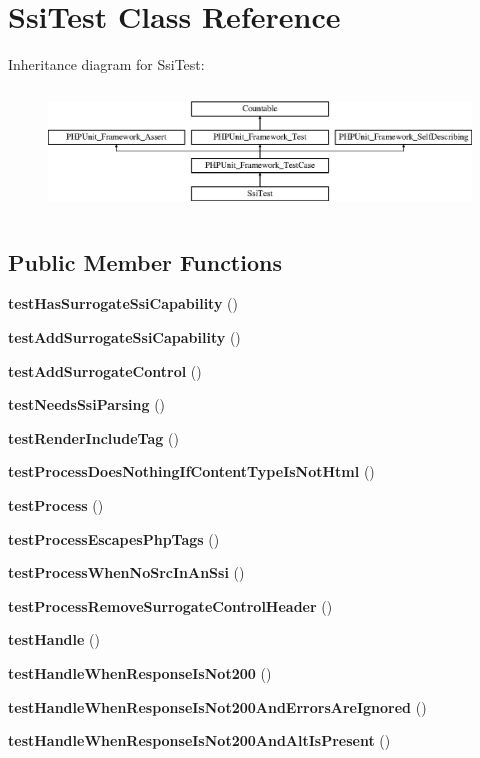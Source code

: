 \section{Ssi\+Test Class Reference}
\label{class_symfony_1_1_component_1_1_http_kernel_1_1_tests_1_1_http_cache_1_1_ssi_test}
Inheritance diagram for Ssi\+Test\+:\begin{figure}[H]
\begin{center}
\leavevmode
\includegraphics[height=3.303835cm]{class_symfony_1_1_component_1_1_http_kernel_1_1_tests_1_1_http_cache_1_1_ssi_test}
\end{center}
\end{figure}
\subsection*{Public Member Functions}
\begin{DoxyCompactItemize}
\item 
{\bf test\+Has\+Surrogate\+Ssi\+Capability} ()
\item 
{\bf test\+Add\+Surrogate\+Ssi\+Capability} ()
\item 
{\bf test\+Add\+Surrogate\+Control} ()
\item 
{\bf test\+Needs\+Ssi\+Parsing} ()
\item 
{\bf test\+Render\+Include\+Tag} ()
\item 
{\bf test\+Process\+Does\+Nothing\+If\+Content\+Type\+Is\+Not\+Html} ()
\item 
{\bf test\+Process} ()
\item 
{\bf test\+Process\+Escapes\+Php\+Tags} ()
\item 
{\bf test\+Process\+When\+No\+Src\+In\+An\+Ssi} ()
\item 
{\bf test\+Process\+Remove\+Surrogate\+Control\+Header} ()
\item 
{\bf test\+Handle} ()
\item 
{\bf test\+Handle\+When\+Response\+Is\+Not200} ()
\item 
{\bf test\+Handle\+When\+Response\+Is\+Not200\+And\+Errors\+Are\+Ignored} ()
\item 
{\bf test\+Handle\+When\+Response\+Is\+Not200\+And\+Alt\+Is\+Present} ()
\end{DoxyCompactItemize}
